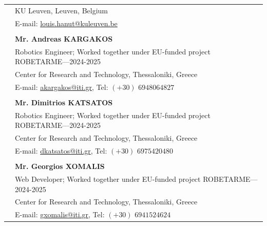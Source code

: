 \documentclass[a4paper,10pt,twoside]{article}
\begin{document}
\begin{tabular}{rp{14cm}}
&KU Leuven, Leuven, Belgium \\
& E-mail: \href{mailto: louis.hanut@kuleuven.be}{louis.hanut@kuleuven.be}\\
&\\
& \textbf{Mr. Andreas KARGAKOS} \\
& {Robotics Engineer; Worked together under EU-funded project ROBETARME}---2024-2025\\
& Center for Research and Technology, Thessaloniki, Greece \\
& E-mail: \href{mailto: akargakos@iti.gr}{akargakos@iti.gr}, Tel: $(+30)$ $694 806 4827$  \\
&\\
& \textbf{Mr. Dimitrios KATSATOS} \\
& {Robotics Engineer; Worked together under EU-funded project ROBETARME}---2024-2025\\
&Center for Research and Technology, Thessaloniki, Greece \\
& E-mail: \href{mailto: dkatsatos@iti.gr}{dkatsatos@iti.gr}, Tel: $(+30)$ $697 542 0480$ \\
&\\
& \textbf{Mr. Georgios XOMALIS} \\
& {Web Developer; Worked together under EU-funded project ROBETARME}---2024-2025\\
&Center for Research and Technology, Thessaloniki, Greece \\
& E-mail: \href{mailto: gxomalis@iti.gr}{gxomalis@iti.gr}, Tel: $(+30)$ $694 152 4624$ \\
\end{tabular}
\newpage\noindent
\end{document}
